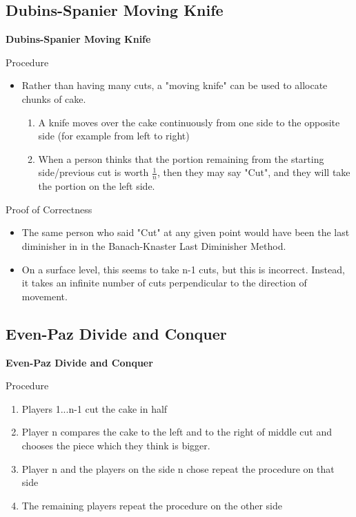 \documentclass[aspectratio=169,xcolor=dvipsnames]{beamer}
\begin{document}
\subsection{Dubins-Spanier Moving Knife}
\begin{frame}
	\Huge{\centerline{\textbf{Dubins-Spanier Moving Knife}}}
\end{frame}
\begin{frame}{Procedure}
	\begin{itemize}
		\item Rather than having many cuts, a "moving knife" can be used to allocate chunks of cake.
		\begin{enumerate}
			\item A knife moves over the cake continuously from one side to the opposite side (for example from left to right)
			\item When a person thinks that the portion remaining from the starting side/previous cut is worth $\frac{1}{n}$, then they may say "Cut", and they will take the portion on the left side.
		\end{enumerate}
	\end{itemize}
\end{frame}
\begin{frame}{Proof of Correctness}
	\begin{itemize}
		\item The same person who said "Cut" at any given point would have been the last diminisher in in the Banach-Knaster Last Diminisher Method.\pause
		\item On a surface level, this seems to take n-1 cuts, but this is incorrect. Instead, it takes an infinite number of cuts perpendicular to the direction of movement.
	\end{itemize}
\end{frame}
\subsection{Even-Paz Divide and Conquer}
\begin{frame}
	\Huge{\centerline{\textbf{Even-Paz Divide and Conquer}}}
\end{frame}
\begin{frame}{Procedure}
	\begin{enumerate}
		\item Players 1...n-1 cut the cake in half
		\item Player n compares the cake to the left and to the right of middle cut and chooses the piece which they think is bigger.\pause
		\item Player n and the players on the side n chose repeat the procedure on that side
		\item The remaining players repeat the procedure on the other side
	\end{enumerate}
\end{frame}
\end{document}
